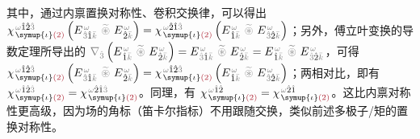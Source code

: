 其中，通过内禀置换对称性\cite{boydNonlinearOptics2019}、卷积交换律，可以得出 $\chi^{\;\! \mathcolor{gray}{\omega} \hat{1} \hat{2} \mathcolor{gray}{\hat{3}}}_{\;\! \symup{\iota} \textcolor{Maroon}{(2)}} \left( E^{\;\!\mathcolor{gray}{\omega}}_{\;\! \mathcolor{gray}{\hat{3}} \hat{1} \mathcolor{gray}{\bar{k}}} ~\mathcolor{gray}{\widetilde \circledast}~ E^{\;\!\mathcolor{gray}{\omega}}_{\;\! \hat{2} \mathcolor{gray}{\bar{k}}} \right) = \chi^{\;\! \mathcolor{gray}{\omega} \hat{2} \hat{1} \mathcolor{gray}{\hat{3}}}_{\;\! \symup{\iota} \textcolor{Maroon}{(2)}} \left( E^{\;\!\mathcolor{gray}{\omega}}_{\;\! \hat{1} \mathcolor{gray}{\bar{k}}} ~\mathcolor{gray}{\widetilde \circledast}~ E^{\;\!\mathcolor{gray}{\omega}}_{\;\! \mathcolor{gray}{\hat{3}} \hat{2} \mathcolor{gray}{\bar{k}}} \right)$；另外，傅立叶变换的导数定理所导出的 $\mathcolor{gray}{\nabla_{\hat{3}}} \left( E^{\;\!\mathcolor{gray}{\omega}}_{\;\! \hat{1} \mathcolor{gray}{\bar{k}}} ~\mathcolor{gray}{\widetilde \circledast}~ E^{\;\!\mathcolor{gray}{\omega}}_{\;\! \hat{2} \mathcolor{gray}{\bar{k}}} \right) = E^{\;\!\mathcolor{gray}{\omega}}_{\;\! \mathcolor{gray}{\hat{3}} \hat{1} \mathcolor{gray}{\bar{k}}} ~\mathcolor{gray}{\widetilde \circledast}~ E^{\;\!\mathcolor{gray}{\omega}}_{\;\! \hat{2} \mathcolor{gray}{\bar{k}}} = E^{\;\!\mathcolor{gray}{\omega}}_{\;\! \hat{1} \mathcolor{gray}{\bar{k}}} ~\mathcolor{gray}{\widetilde \circledast}~ E^{\;\!\mathcolor{gray}{\omega}}_{\;\! \mathcolor{gray}{\hat{3}} \hat{2} \mathcolor{gray}{\bar{k}}}$，可得 $\chi^{\;\! \mathcolor{gray}{\omega} \hat{1} \hat{2} \mathcolor{gray}{\hat{3}}}_{\;\! \symup{\iota} \textcolor{Maroon}{(2)}} \left( E^{\;\!\mathcolor{gray}{\omega}}_{\;\! \mathcolor{gray}{\hat{3}} \hat{1} \mathcolor{gray}{\bar{k}}} ~\mathcolor{gray}{\widetilde \circledast}~ E^{\;\!\mathcolor{gray}{\omega}}_{\;\! \hat{2} \mathcolor{gray}{\bar{k}}} \right) = \chi^{\;\! \mathcolor{gray}{\omega} \hat{1} \hat{2} \mathcolor{gray}{\hat{3}}}_{\;\! \symup{\iota} \textcolor{Maroon}{(2)}} \left( E^{\;\!\mathcolor{gray}{\omega}}_{\;\! \hat{1} \mathcolor{gray}{\bar{k}}} ~\mathcolor{gray}{\widetilde \circledast}~ E^{\;\!\mathcolor{gray}{\omega}}_{\;\! \mathcolor{gray}{\hat{3}} \hat{2} \mathcolor{gray}{\bar{k}}} \right)$；两相对比，即有 $\chi^{\;\! \mathcolor{gray}{\omega} \hat{1} \hat{2} \mathcolor{gray}{\hat{3}}}_{\;\! \symup{\iota} \textcolor{Maroon}{(2)}} = \chi^{\;\! \mathcolor{gray}{\omega} \hat{2} \hat{1} \mathcolor{gray}{\hat{3}}}_{\;\! \symup{\iota} \textcolor{Maroon}{(2)}}$。同理，有 $\chi^{\;\! \mathcolor{gray}{\omega} \hat{1} \hat{2}}_{\;\! \symup{\iota} \textcolor{Maroon}{(2)}} = \chi^{\;\! \mathcolor{gray}{\omega} \hat{2} \hat{1}}_{\;\! \symup{\iota} \textcolor{Maroon}{(2)}}$。这比内禀对称性更高级，因为场的角标（笛卡尔指标）不用跟随交换，类似前述多极子/矩的置换对称性。

